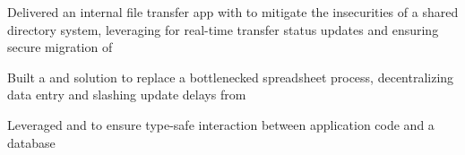 \begin{bullets}
	\item Delivered an internal file transfer app with  to mitigate the insecurities of a shared directory system, leveraging  for real-time transfer status updates and ensuring secure migration of 

	\item Built a  and  solution to replace a bottlenecked spreadsheet process, decentralizing data entry and slashing update delays from 
	
	
	\item Leveraged  and  to ensure type-safe interaction between application code and a  database


\end{bullets}
